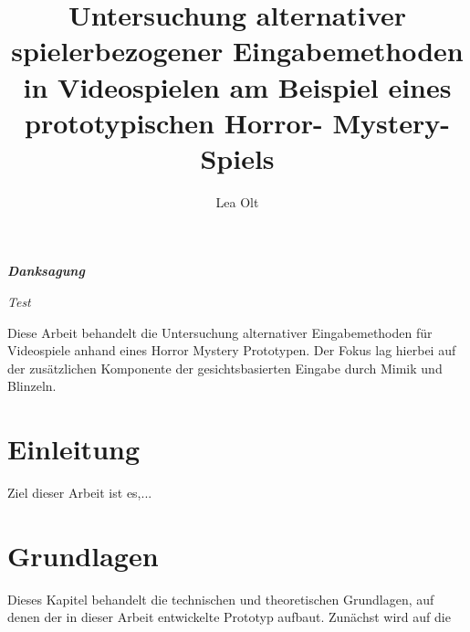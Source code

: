 \documentclass[intern]{cgMA}
\title{Untersuchung alternativer spielerbezogener Eingabemethoden in Videospielen am Beispiel eines prototypischen Horror-
Mystery-Spiels}
\author{Lea Olt}
\newenvironment{new_abstract}{
  \vspace*{\fill}
  \begin{center}%
    \bfseries\abstractname
  \end{center}}%
  {\vfill}
\begin{document}
   \maketitle  
\newpage
\thispagestyle{empty}
\quad 
\newpage

\begin{center}
  \textbf{\textit{Danksagung}}
  \end{center}
  \begin{center}
\textit{Test}
\end{center}
\newpage
\thispagestyle{empty}
\quad 
\newpage

\begin{new_abstract}
Diese Arbeit behandelt die Untersuchung alternativer Eingabemethoden für Videospiele anhand eines Horror Mystery Prototypen. Der Fokus lag hierbei auf der zusätzlichen Komponente der gesichtsbasierten Eingabe durch Mimik und Blinzeln. 
\end{new_abstract}
\begin{new_abstract}

\end{new_abstract}
\newpage

\thispagestyle{empty}
\quad 
\newpage

\tableofcontents
\newpage
{}
\section{Einleitung}

Ziel dieser Arbeit ist es,...
\section{Grundlagen}
Dieses Kapitel behandelt die technischen und theoretischen Grundlagen, auf denen der in dieser Arbeit entwickelte Prototyp aufbaut. Zunächst wird auf die
\end{document}
